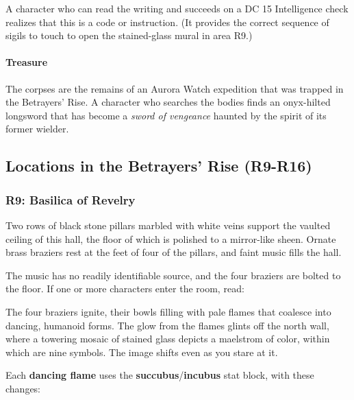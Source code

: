 \documentclass[letterpaper, 11pt, bg=full, twocolumn]{dndbook}
\begin{document}
A character who can read the writing and succeeds on a DC 15 Intelligence check realizes that this is a code or instruction. (It provides the correct sequence of sigils to touch to open the stained-glass mural in area R9.)

\paragraph{Treasure}

The corpses are the remains of an Aurora Watch expedition that was trapped in the Betrayers' Rise. A character who searches the bodies finds an onyx-hilted longsword that has become a \textit{sword of vengeance} haunted by the spirit of its former wielder.

\subsection{Locations in the Betrayers' Rise (R9-R16)}

\subsubsection{R9: Basilica of Revelry}

\begin{DndReadAloud}
Two rows of black stone pillars marbled with white veins support the vaulted ceiling of this hall, the floor of which is polished to a mirror-like sheen. Ornate brass braziers rest at the feet of four of the pillars, and faint music fills the hall.
\end{DndReadAloud}

The music has no readily identifiable source, and the four braziers are bolted to the floor. If one or more characters enter the room, read:

\begin{DndReadAloud}
The four braziers ignite, their bowls filling with pale flames that coalesce into dancing, humanoid forms. The glow from the flames glints off the north wall, where a towering mosaic of stained glass depicts a maelstrom of color, within which are nine symbols. The image shifts even as you stare at it.
\end{DndReadAloud}

Each \textbf{dancing flame} uses the \textbf{succubus}/\textbf{incubus} stat block, with these changes:

\end{document}
